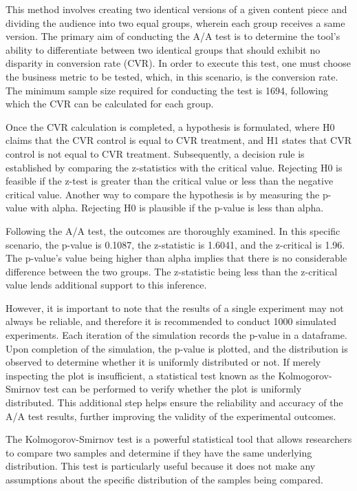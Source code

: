 \documentclass{article}
\begin{document}
This method involves creating two identical versions of a given content piece and dividing the audience into two equal groups, wherein each group receives a same version. The primary aim of conducting the A/A test is to determine the tool's ability to differentiate between two identical groups that should exhibit no disparity in conversion rate (CVR). In order to execute this test, one must choose the business metric to be tested, which, in this scenario, is the conversion rate. The minimum sample size required for conducting the test is 1694, following which the CVR can be calculated for each group.

Once the CVR calculation is completed, a hypothesis is formulated, where H0 claims that the CVR control is equal to CVR treatment, and H1 states that CVR control is not equal to CVR treatment. Subsequently, a decision rule is established by comparing the z-statistics with the critical value. Rejecting H0 is feasible if the z-test is greater than the critical value or less than the negative critical value. Another way to compare the hypothesis is by measuring the p-value with alpha. Rejecting H0 is plausible if the p-value is less than alpha.

Following the A/A test, the outcomes are thoroughly examined. In this specific scenario, the p-value is 0.1087, the z-statistic is 1.6041, and the z-critical is 1.96. The p-value's value being higher than alpha implies that there is no considerable difference between the two groups. The z-statistic being less than the z-critical value lends additional support to this inference. 

However, it is important to note that the results of a single experiment may not always be reliable, and therefore it is recommended to conduct 1000 simulated experiments. Each iteration of the simulation records the p-value in a dataframe. Upon completion of the simulation, the p-value is plotted, and the distribution is observed to determine whether it is uniformly distributed or not. If merely inspecting the plot is insufficient, a statistical test known as the Kolmogorov-Smirnov test can be performed to verify whether the plot is uniformly distributed. This additional step helps ensure the reliability and accuracy of the A/A test results, further improving the validity of the experimental outcomes.

The Kolmogorov-Smirnov test is a powerful statistical tool that allows researchers to compare two samples and determine if they have the same underlying distribution. This test is particularly useful because it does not make any assumptions about the specific distribution of the samples being compared.
\end{document}
